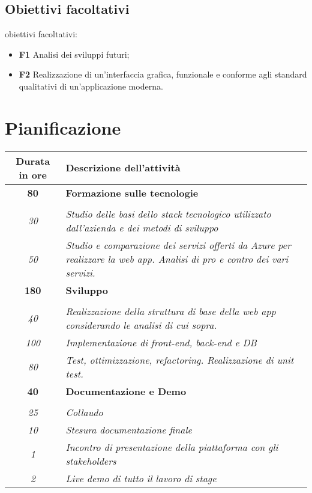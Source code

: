 \subsection{Obiettivi facoltativi}
obiettivi facoltativi:
\begin{itemize}
    \item \textbf{F1} Analisi dei sviluppi futuri;
    \item \textbf{F2} Realizzazione di un'interfaccia grafica, funzionale e conforme agli standard qualitativi di un'applicazione moderna.

\end{itemize}
\section{Pianificazione}
\label{sec:pianificazione}
\begin{table}[!h]
    \label{tab:ripartizione-ore}
    \begin{tabularx}{\textwidth}{|c|X|}
        \hline
        \textbf{Durata in ore} & \textbf{Descrizione dell'attività} \\\hline
        
        \textbf{80} & \textbf{Formazione sulle tecnologie} \\ \hdashline
            \multirow{2}{0cm}\\
                \textit{30} &
                \textit{Studio delle basi dello stack tecnologico utilizzato dall'azienda e dei metodi di sviluppo} \\
                \textit{50} &
                \textit{Studio e comparazione dei servizi offerti da Azure per realizzare la web app. Analisi di pro e contro dei vari servizi.} \\
        \hline
        
        \textbf{180} & \textbf{Sviluppo} \\ \hdashline 
        \multirow{3}{0cm}\\ 
        \textit{40} & 
        \textit{Realizzazione della struttura di base della web app considerando le analisi di cui sopra.} \\
        \textit{100} & 
        \textit{Implementazione di front-end, back-end e DB} \\
        \textit{80} & 
        \textit{Test, ottimizzazione, refactoring. Realizzazione di unit test.} \\
        \hline
        
        \textbf{40} & \textbf{Documentazione e Demo}  \\ \hdashline 
        \multirow{4}{0cm}\\ 
        \textit{25} & 
        \textit{Collaudo} \\
        \textit{10} & 
        \textit{Stesura documentazione finale} \\
        \textit{1} & 
        \textit{Incontro di presentazione della piattaforma con gli stakeholders} \\
        \textit{2} & 
        \textit{Live demo di tutto il lavoro di stage} \\
        \hline
        

\end{tabularx}
\end{table}

